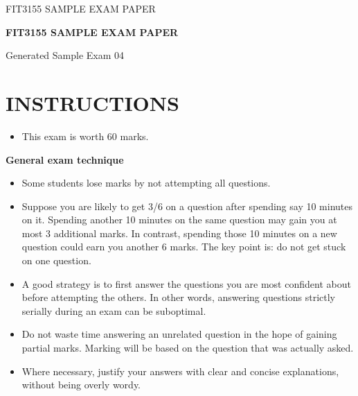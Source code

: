 \documentclass[12pt,letterpaper]{article}
\begin{document}
\begin{titlepage}
  \thispagestyle{empty}
  \vspace*{0.18\textheight}
  {\Large FIT3155 \hfill SAMPLE EXAM PAPER\par}
  \vspace{2.2cm}
  \begin{center}
    {\LARGE\bfseries FIT3155 SAMPLE EXAM PAPER\par}
    \vspace{0.8cm}
    {\large Generated Sample Exam 04\par}
  \end{center}
\end{titlepage}

\setcounter{page}{2}

\section*{INSTRUCTIONS}

\begin{itemize}
  \item This exam is worth 60 marks.
\end{itemize}

\begin{center}
  \textbf{General exam technique}
\end{center}

\begin{itemize}
  \item Some students lose marks by not attempting all questions.

  \item Suppose you are likely to get 3/6 on a question after spending say 10 minutes on it.
  Spending another 10 minutes on the same question may gain you at most 3 additional
  marks. In contrast, spending those 10 minutes on a new question could earn you another
  6 marks. The key point is: do not get stuck on one question.

  \item A good strategy is to first answer the questions you are most confident about before
  attempting the others. In other words, answering questions strictly serially during an
  exam can be suboptimal.

  \item Do not waste time answering an unrelated question in the hope of gaining partial marks.
  Marking will be based on the question that was actually asked.

  \item Where necessary, justify your answers with clear and concise explanations, without being
  overly wordy.
\end{itemize}
\end{document}
